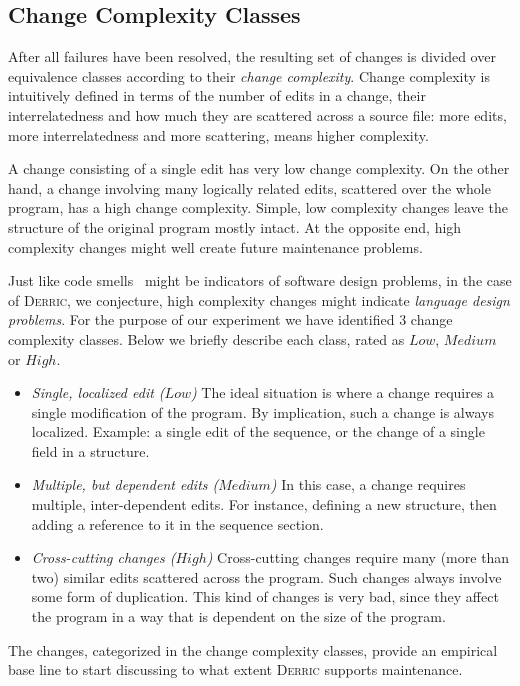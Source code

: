 \documentclass[a4paper]{llncs}
\def\derric{\textsc{Derric}\xspace}
\def\levelGood{\ensuremath{Low}\xspace}
\def\levelOk{\ensuremath{Medium}\xspace}
\def\levelBad{\ensuremath{High}\xspace}
\begin{document}
\subsection{Change Complexity Classes\label{sect:complexity_classes}}

\noindent
After all failures have been resolved, the resulting set of changes is divided over equivalence classes according to their \textit{change complexity}. 
Change complexity is intuitively defined in terms of the number of edits in a change, their interrelatedness and how much they are scattered across a source file: more edits, more interrelatedness and more scattering, means higher complexity.

A change consisting of a single edit has very low change complexity.
On the other hand, a change involving many logically related edits, scattered over the whole program, has a high change complexity.
Simple, low complexity changes leave the structure of the original program mostly intact. 
At the opposite end, high complexity changes might well create future maintenance problems. 

Just like code smells~\cite{RefactoringBook} might be indicators of software design problems, in the case of \derric, we conjecture, high complexity changes might indicate \textit{language design problems}. 
For the purpose of our experiment we have identified 3 change complexity classes. 
Below we briefly describe each class, rated as \levelGood, \levelOk or \levelBad.

\begin{itemize}
\item \textit{Single, localized edit (\levelGood)}
The ideal situation is where a change requires a single modification of the program. 
By implication, such a change is always localized. 
Example: a single edit of the sequence, or the change of a single field in a structure.

\item \textit{Multiple, but dependent edits (\levelOk)}
In this case, a change requires multiple, inter-dependent edits. 
For instance, defining a new structure, then adding a reference to it in the sequence section.

\item \textit{Cross-cutting changes (\levelBad)}
Cross-cutting changes require many (more than two) similar edits scattered across the program. 
Such changes always involve some form of duplication. 
This kind of changes is very bad, since they affect the program in a way that is dependent on the size of the program. 
\end{itemize}
The changes, categorized in the change complexity classes, provide an empirical base line to start discussing to what extent \derric supports maintenance.
\end{document}
